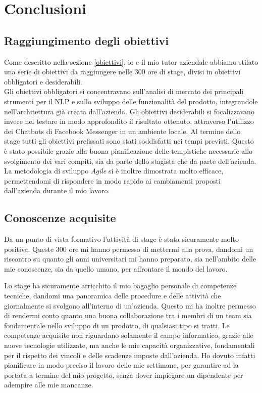 
\chapter{Conclusioni}
\label{cap:conclusioni}

\section{Raggiungimento degli obiettivi}
Come descritto nella sezione \ref{obiettivi}, io e il mio tutor aziendale abbiamo stilato una serie di obiettivi da raggiungere nelle 300 ore di stage, divisi in obiettivi obbligatori e desiderabili. \\ 
Gli obiettivi obbligatori si concentravano sull'analisi di mercato dei principali strumenti per il \gls{NLP} e sullo sviluppo delle funzionalità del prodotto, integrandole nell'architettura già creata dall'azienda. Gli obiettivi desiderabili si focalizzavano invece nel testare in modo approfondito il risultato ottenuto, attraverso l'utilizzo dei \glspl{Chatbot} di Facebook Messenger in un ambiente locale. 
Al termine dello stage tutti gli obiettivi prefissati sono stati soddisfatti nei tempi previsti. Questo è stato possibile grazie alla buona pianificazione delle tempistiche necessarie allo svolgimento dei vari compiti, sia da parte dello stagista che da parte dell'azienda. La metodologia di sviluppo \emph{Agile} si è inoltre dimostrata molto efficace, permettendomi di rispondere in modo rapido ai cambiamenti proposti dall'azienda durante il mio lavoro. 
\section{Conoscenze acquisite}
Da un punto di vista formativo l'attività di stage è stata sicuramente molto positiva. Queste 300 ore mi hanno permesso di mettermi alla prova, dandomi un riscontro su quanto gli anni universitari mi hanno preparato, sia nell'ambito delle mie conoscenze, sia da quello umano, per affrontare il mondo del lavoro.


Lo stage ha sicuramente arricchito il mio bagaglio personale di competenze tecniche, dandomi una panoramica delle procedure e delle attività che giornalmente si svolgono all'interno di un'azienda. Questo mi ha inoltre permesso di rendermi conto quanto una buona collaborazione tra i membri di un team sia fondamentale nello sviluppo di un prodotto, di qualsiasi tipo si tratti.
Le competenze acquisite non riguardano solamente il campo informatico, grazie alle nuove tecnologie utilizzate, ma anche le mie capacità organizzative, fondamentali per il rispetto dei vincoli e delle scadenze imposte dall'azienda. Ho dovuto infatti pianificare in modo preciso il lavoro delle mie settimane, per garantire ad \azienda{} la portata a termine del mio progetto, senza dover impiegare un dipendente per adempire alle mie mancanze. 

